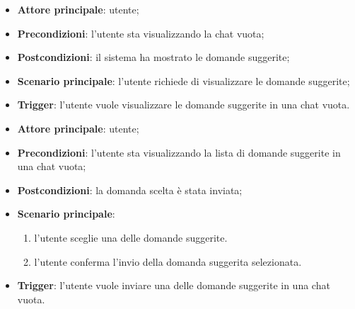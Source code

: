 \documentclass[10pt, a4paper]{article}
\begin{document}
    \begin{itemize}
        \item \textbf{Attore principale}: utente;
        \item \textbf{Precondizioni}: l’utente sta visualizzando la chat vuota;
        \item \textbf{Postcondizioni}: il sistema ha mostrato le domande suggerite;
        \item \textbf{Scenario principale}: l’utente richiede di visualizzare le domande suggerite;
        \item \textbf{Trigger}: l’utente vuole visualizzare le domande suggerite in una chat vuota.
    \end{itemize}

    \begin{itemize}
        \item \textbf{Attore principale}: utente;
        \item \textbf{Precondizioni}: l’utente sta visualizzando la lista di domande suggerite in una chat vuota;
        \item \textbf{Postcondizioni}: la domanda scelta è stata inviata;
        \item \textbf{Scenario principale}:
        \begin{enumerate}
            \item l’utente sceglie una delle domande suggerite.
            \item l’utente conferma l'invio della domanda suggerita selezionata.
        \end{enumerate}
        \item \textbf{Trigger}: l’utente vuole inviare una delle domande suggerite in una chat vuota.
    \end{itemize}
\end{document}
